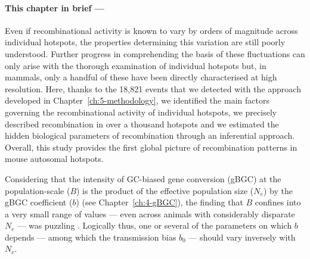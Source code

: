 {\small{} \itshape{}

\paragraph{This chapter in brief —}

Even if recombinational activity is known to vary by orders of magnitude across individual hotspots, the properties determining this variation are still poorly understood.
Further progress in comprehending the basis of these fluctuations can only arise with the thorough examination of individual hotspots but, in mammals, only a handful of these have been directly characterised at high resolution.
Here, thanks to the 18,821 events that we detected with the approach developed in Chapter~\ref{ch:5-methodology}, we identified the main factors governing the recombinational activity of individual hotspots, we precisely described recombination in over a thousand hotspots and we estimated the hidden biological parameters of recombination through an inferential approach.
Overall, this study provides the first global picture of recombination patterns in mouse autosomal hotspots.




}

\newpage

Considering that the intensity of GC-biased gene conversion (gBGC) at the population-scale ($B$) is the product of the effective population size ($N_e$) by the gBGC coefficient ($b$) (see Chapter~\ref{ch:4-gBGC}), the finding that $B$ confines into a very small range of values — even across animals with considerably disparate $N_e$ — was puzzling \citep{galtier2018codon}.
Logically thus, one or several of the parameters on which $b$ depends — among which the transmission bias $b_0$ — should vary inversely with $N_e$.


